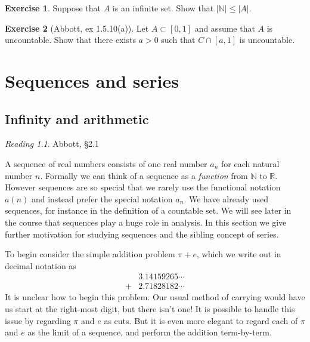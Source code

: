 \documentclass[11pt,oneside]{amsbook}
\newcommand{\NN}{\mathbb N}
\newcommand{\RR}{\mathbb R}
\theoremstyle{definition}
\newtheorem{exerc}{Exercise}[section]
\theoremstyle{plain}
\theoremstyle{definition}
\theoremstyle{remark}
\newtheorem*{reading}{Reading}
\numberwithin{equation}{section}
\numberwithin{figure}{section}
\begin{document}
\begin{exerc}
  Suppose that $A$ is an infinite set. Show that $|\NN|\leq|A|$.
\end{exerc}

\begin{exerc}[Abbott, ex 1.5.10(a)]
  Let $A\subset[0,1]$ and assume that $A$ is uncountable. Show that there exists $a>0$ such that $C\cap[a,1]$ is uncountable.
\end{exerc}

\chapter{Sequences and series}

\section{Infinity and arithmetic}
\label{sec:sequences}

\begin{reading}
  Abbott, \S 2.1
\end{reading}

A sequence of real numbers consists of one real number $a_n$ for each natural number $n$. Formally we can think of a sequence as a \emph{function} from $\NN$ to $\RR$. However sequences are so special that we rarely use the functional notation $a(n)$ and instead prefer the special notation $a_n$. We have already used sequences, for instance in the definition of a countable set. We will see later in the course that sequences play a huge role in analysis. In this section we give further motivation for studying sequences and the sibling concept of series.

To begin consider the simple addition problem $\pi+e$, which we write out in decimal notation as
\begin{align*}
&3.14159265\cdots\\
{}+&2.71828182\cdots
\end{align*}
It is unclear how to begin this problem. Our usual method of carrying would have us start at the right-most digit, but there isn't one! It is possible to handle this issue by regarding $\pi$ and $e$ as cuts. But it is even more elegant to regard each of $\pi$ and $e$ as the limit of a sequence, and perform the addition term-by-term.
\end{document}
